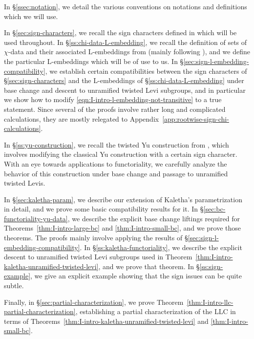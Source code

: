 \documentclass[reqno]{amsart}
\numberwithin{equation}{subsection}
\theoremstyle{remark}
\numberwithin{equation}{subsection}
\numberwithin{figure}{subsection}
\begin{document}
In \S\ref{ssec:notation}, we detail the various conventions on notations and definitions which we will use.

In \S\ref{sec:sign-characters}, we recall the sign characters defined in \cite{FKS23} which will be used throughout. In \S\ref{ss:chi-data-L-embedding}, we recall the definition of sets of $\chi$-data and their associated L-embeddings from \cite{LS87} (mainly following \cite{Kal21a}), and we define the particular L-embeddings which will be of use to us. In \S\ref{sec:sign-l-embedding-compatibility}, we establish certain compatibilities between the sign characters of \S\ref{sec:sign-characters} and the L-embeddings of \S\ref{ss:chi-data-L-embedding} under base change and descent to unramified twisted Levi subgroups, and in particular we show how to modify \eqref{eqn:I-intro-l-embedding-not-transitive} to a true statement. Since several of the proofs involve rather long and complicated calculations, they are mostly relegated to Appendix~\ref{app:rootwise-sign-chi-calculations}.

In \S\ref{ss:yu-construction}, we recall the twisted Yu construction from \cite{FKS23}, which involves modifying the classical Yu construction \cite{Yu01} with a certain sign character. With an eye towards applications to functoriality, we carefully analyze the behavior of this construction under base change and passage to unramified twisted Levis.

In \S\ref{sec:kaletha-param}, we describe our extension of Kaletha's parametrization in detail, and we prove some basic compatibility results for it. In \S\ref{sec:bc-functoriality-yu-data}, we describe the explicit base change liftings required for Theorems~\ref{thm:I-intro-large-bc} and \ref{thm:I-intro-small-bc}, and we prove those theorems. The proofs mainly involve applying the results of \S\ref{sec:sign-l-embedding-compatibility}. In \S\ref{ss:kaletha-functoriality}, we describe the explicit descent to unramified twisted Levi subgroups used in Theorem~\ref{thm:I-intro-kaletha-unramified-twisted-levi}, and we prove that theorem. In \S\ref{ss:sign-example}, we give an explicit example showing that the sign issues can be quite subtle.

Finally, in \S\ref{sec:partial-characterization}, we prove Theorem~\ref{thm:I-intro-llc-partial-characterization}, establishing a partial characterization of the LLC in terms of Theorems~\ref{thm:I-intro-kaletha-unramified-twisted-levi} and \ref{thm:I-intro-small-bc}.
\end{document}
